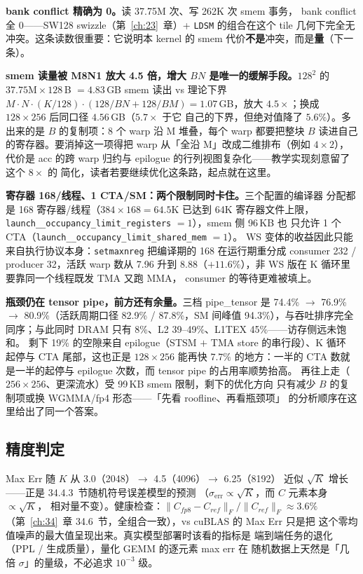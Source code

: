\textbf{bank conflict 精确为 0。}读 37.75M 次、写 262K 次 smem 事务，
bank conflict 全 0——SW128 swizzle（第~\ref{ch:23}~章）+ \texttt{LDSM}
的组合在这个 tile 几何下完全无冲突。这条读数很重要：它说明本 kernel 的
smem 代价\textbf{不是}冲突，而是\textbf{量}（下一条）。

\textbf{smem 读量被 M8N1 放大 4.5 倍，增大 $BN$ 是唯一的缓解手段。}$128^2$ 的
$37.75\text{M}\times128$\,B $=4.83$\,GB smem 读出 vs 理论下界
$M\!\cdot\!N\!\cdot\!(K/128)\!\cdot\!(128/BN+128/BM)=1.07$\,GB，放大
$4.5\times$；换成 $128\times256$ 后同口径 $4.56$\,GB（$5.7\times$ 于它
自己的下界，但绝对值降了 $5.6\%$）。多出来的是 $B$ 的复制项：8 个 warp
沿 M 堆叠，每个 warp 都要把整块 $B$ 读进自己的寄存器。要消掉这一项得把
warp 从「全沿 M」改成二维排布（例如 $4\times2$），代价是 acc 的跨 warp
归约与 epilogue 的行列视图复杂化——教学实现刻意留了这个 $8\times$ 的
简化，读者若要继续优化这条路，起点就在这里。

\textbf{寄存器 168/线程、1 CTA/SM：两个限制同时卡住。}三个配置的编译器
分配都是 168 寄存器/线程（$384\times168=64.5$K 已达到 64K 寄存器文件上限，
\texttt{launch\_\_occupancy\_limit\_registers} $=1$），smem 侧 96\,KB 也
只允许 1 个 CTA（\texttt{launch\_\_occupancy\_limit\_shared\_mem} $=1$）。
WS 变体的收益因此只能来自执行协议本身：\texttt{setmaxnreg} 把编译期的
168 在运行期重分成 consumer 232 / producer 32，活跃 warp 数从 7.96 升到
8.88（$+11.6\%$），非 WS 版在 K 循环里要靠同一个线程既发 TMA 又跑 MMA，
consumer 的等待更难被填上。

\textbf{瓶颈仍在 tensor pipe，前方还有余量。}三档
pipe\_tensor 是 74.4\% $\to$ 76.9\% $\to$ 80.9\%（活跃周期口径
82.9\% / 87.8\%，SM 间峰值 94.3\%），与吞吐排序完全同序；与此同时
DRAM 只有 8\%、L2 39--49\%、L1TEX 45\%——访存侧远未饱和。
剩下 19\% 的空隙来自 epilogue（STSM $+$ TMA store 的串行段）、K 循环
起停与 CTA 尾部，这也正是 $128\times256$ 能再快 $7.7\%$ 的地方：一半的
CTA 数就是一半的起停与 epilogue 次数，而 tensor pipe 的占用率顺势抬高。
再往上走（$256\times256$、更深流水）受 99\,KB smem 限制，剩下的优化方向
只有减少 $B$ 的复制项或换 WGMMA/fp4 形态——「先看 roofline、再看瓶颈项」
的分析顺序在这里给出了同一个答案。

\subsection{精度判定}

Max Err 随 $K$ 从 3.0（2048）$\to$ 4.5（4096）$\to$ 6.25（8192）
近似 $\sqrt{K}$ 增长——正是 34.4.3~节随机符号误差模型的预测
（$\sigma_{\text{err}}\propto\sqrt{K}$，而 $C$ 元素本身 $\propto\sqrt{K}$，
相对量不变）。健康检查：$\|C_{fp8}-C_{ref}\|_F/\|C_{ref}\|_F\approx 3.6\%$
（第~\ref{ch:34}~章 34.6~节，全组合一致），vs cuBLAS 的 Max Err 只是把
这个零均值噪声的最大值呈现出来。真实模型部署时该看的指标是
端到端任务的退化（PPL / 生成质量），量化 GEMM 的逐元素 max err 在
随机数据上天然是「几倍 $\sigma$」的量级，不必追求 $10^{-3}$ 级。

